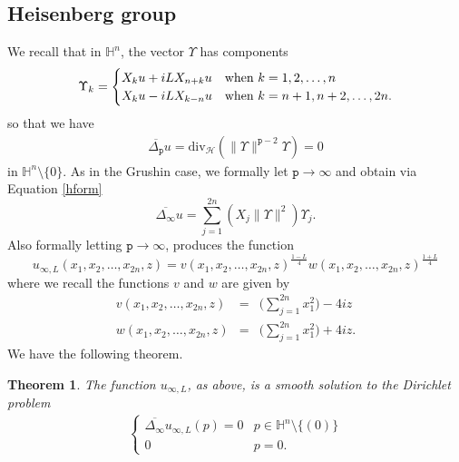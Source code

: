 \documentclass[12pt]{amsart}
\theoremstyle{plain}
\newtheorem{theorem}{Theorem}[section]
\theoremstyle{definition}
\numberwithin{equation}{section}
\begin{document}
\subsection{Heisenberg group}
We recall that in $\mathbb{H}^n$, the vector $\Upsilon$ has components 
\begin{eqnarray*}
\Upsilon_k= \begin{cases}
X_ku+iLX_{n+k}u & \textmd{when $k=1,2,\ldots, n$} \\
X_{k}u-iLX_{k-n}u & \textmd {when $k=n+1, n+2, \ldots, 2n$}.
\end{cases}
\end{eqnarray*}
so that we have 
\begin{eqnarray*}
\overline{\Delta_{\texttt{p}}}u={\operatorname{div_{\mathcal{H}}}} (\| \Upsilon\|^{{\texttt{p}}-2}\Upsilon  )=0
\end{eqnarray*}
in $\mathbb{H}^n\setminus\{0\}$. 
As in the Grushin case, we formally let ${\texttt{p}} \to \infty$ and obtain via Equation \eqref{hform} 
\begin{equation*}
\overline{\Delta_{\infty}}u= \sum_{j=1}^{2n}(X_j\| \Upsilon  \|^{2} )\Upsilon _j.
\end{equation*}
Also formally letting ${\texttt{p}} \to \infty$, produces the function 
\begin{equation*}
u_{\infty,L}(x_1,x_2,\ldots,x_{2n},z) =
v(x_1,x_2,\ldots,x_{2n},z)^{\frac{1-L}{4}}w(x_1,x_2,\ldots,x_{2n},z)^{\frac{1+L}{4}}
\end{equation*}
where we recall the functions $v$ and $w$ are given by
\begin{eqnarray*}
v(x_1,x_2,\ldots,x_{2n},z) & = & \big(\sum_{j=1}^{2n}x_1^2\big)-4iz\\ 
w(x_1,x_2,\ldots,x_{2n},z) & = & \big(\sum_{j=1}^{2n}x_1^2\big)+4iz.
\end{eqnarray*}
We have the following theorem.
\begin{theorem}
The function $u_{\infty,L}$, as above, is a smooth solution to the Dirichlet problem
\begin{eqnarray*}
\left\{\begin{array}{cc}
\overline{\Delta_{\infty}}u_{\infty,L}(p)=0 & p \in \mathbb{H}^n\setminus\{(0)\} \\
0 & p = 0.
\end{array}\right.
\end{eqnarray*}
\end{theorem}
\end{document}
